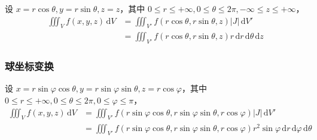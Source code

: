 设 $x=r\cos\theta,y=r\sin\theta,z=z$，其中 $0 \leq r \leq +\infty, 0 \leq \theta \leq 2\pi, -\infty \leq z \leq +\infty$，
\[
    \begin{aligned}
        \iiint_{V} f(x,y,z) \, \mathrm{d}V & = \iiint_{V'} f(r\cos\theta,r\sin\theta,z) \left| J \right| \, \mathrm{d}V'                    \\
                                           & = \iiint_{V'} f(r\cos\theta,r\sin\theta,z) r \, \mathrm{d}r \, \mathrm{d}\theta \, \mathrm{d}z
    \end{aligned}
\]

\subsubsection{球坐标变换}

设 $x=r\sin\varphi\cos\theta,y=r\sin\varphi\sin\theta,z=r\cos\varphi$，其中 $0 \leq r \leq +\infty, 0 \leq \theta \leq 2\pi, 0 \leq \varphi \leq \pi$，
\[
    \begin{aligned}
        \iiint_{V} f(x,y,z) \, \mathrm{d}V & = \iiint_{V'} f(r\sin\varphi\cos\theta,r\sin\varphi\sin\theta,r\cos\varphi) \left| J \right| \, \mathrm{d}V'                                          \\
                                           & = \iiint_{V'} f(r\sin\varphi\cos\theta,r\sin\varphi\sin\theta,r\cos\varphi) r^{2} \sin\varphi \, \mathrm{d}r \, \mathrm{d}\varphi \, \mathrm{d}\theta
    \end{aligned}
\]
